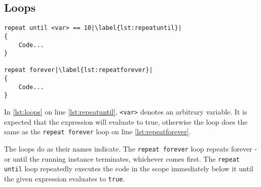 \subsection{Loops}
\begin{lstlisting}[caption={Example of loops}, label={lst:loops},escapechar=|]
repeat until <var> == 10|\label{lst:repeatuntil}|
{
    Code...
}

repeat forever|\label{lst:repeatforever}|
{
    Code...
}
\end{lstlisting}

In \ref{lst:loops} on line \ref{lst:repeatuntil}, \verb|<var>| denotes an arbitrary variable. It is expected that the expression will evaluate to true, otherwise the loop does the same as the \verb|repeat forever| loop on line \ref{lst:repeatforever}.

The loops do as their names indicate. The \verb|repeat forever| loop repeats forever - or until the running instance terminates, whichever comes first. %
The \verb|repeat until| loop repeatedly executes the code in the scope immediately below it until the given expression evaluates to \verb|true|.
